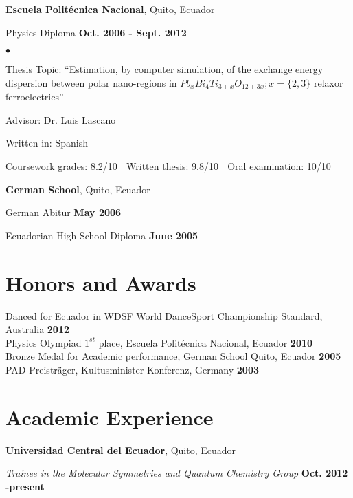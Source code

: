\documentclass[margin,line]{res}
\newenvironment{list1}{
  \begin{list}{\ding{113}}{%
      \setlength{\itemsep}{0in}
      \setlength{\parsep}{0in} \setlength{\parskip}{0in}
      \setlength{\topsep}{0in} \setlength{\partopsep}{0in} 
      \setlength{\leftmargin}{0.17in}}}{\end{list}}
\newenvironment{list2}{
  \begin{list}{$\bullet$}{%
      \setlength{\itemsep}{0in}
      \setlength{\parsep}{0in} \setlength{\parskip}{0in}
      \setlength{\topsep}{0in} \setlength{\partopsep}{0in} 
      \setlength{\leftmargin}{0.2in}}}{\end{list}}
\begin{document}
\begin{resume}
  {\bf Escuela Politécnica Nacional}, Quito, Ecuador\\
  \vspace{-.1in}
  \begin{list1}
    \item[] Physics Diploma \hfill {\bf Oct. 2006 - Sept. 2012}\\
    \begin{list2}
    \vspace{-.1in}
      \item Thesis Topic:  ``Estimation, by computer simulation, of the exchange
	energy dispersion between polar nano-regions in $Pb_xBi_4Ti_{3+x}O_{12+3x}; x=\{2,3\}$
	relaxor ferroelectrics''
      \item Advisor: Dr. Luis Lascano
      \item Written in: Spanish
      \item Coursework grades: 8.2/10 | Written thesis: 9.8/10 | Oral examination: 10/10
    \end{list2}
  \end{list1}

  {\bf German School}, Quito, Ecuador\\
  \vspace{-.1in}
  \begin{list1}
    \item[] German Abitur \hfill {\bf May 2006}
    \item[] Ecuadorian High School Diploma \hfill {\bf June 2005}
  \end{list1}

\section{\sc Honors and Awards}
  Danced for Ecuador in WDSF World DanceSport Championship Standard, Australia \hfill {\bf 2012}\\
  Physics Olympiad $1^{st}$ place, Escuela Politécnica Nacional, Ecuador \hfill {\bf 2010}\\
  Bronze Medal for Academic performance, German School Quito, Ecuador \hfill {\bf 2005}\\
  PAD Preisträger, Kultusminister Konferenz, Germany \hfill {\bf 2003}

\section{\sc Academic Experience}
  {\bf Universidad Central del Ecuador}, Quito, Ecuador
  \begin{list1}
    \item[] {\em Trainee in the Molecular Symmetries and Quantum Chemistry Group} \hfill {\bf Oct. 2012 -present}
  \end{list1}


\end{resume}
\end{document}
